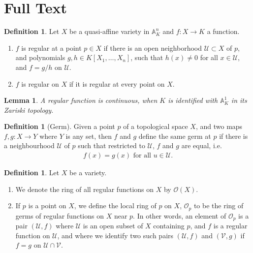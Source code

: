 \documentclass[11pt]{book}
\newtheorem{lemma}[theorem]{Lemma}
\theoremstyle{definition}
\newtheorem{definition}[theorem]{Definition}
\numberwithin{equation}{section}
\begin{document}
\section{Full Text}
\begin{defbox}
    \begin{definition}
        Let \(X\) be a quasi-affine variety in \(\mathbb{A}^n_K\) and \(f: X \rightarrow K\) a function.
        \begin{enumerate}
            \item \(f\) is regular at a point \(p \in X\) if there is an open neighborhood \(\mathcal{U} \subset X\) of \(p\), and polynomials \(g, h \in K[X_1, \ldots, X_n]\), such that \(h(x) \neq 0\) for all \(x \in \mathcal{U}\), and \(f = g/h\) on \(\mathcal{U}\).
            \item \(f\) is regular on \(X\) if it is regular at every point on \(X\).
        \end{enumerate}
    \end{definition}
\end{defbox}
\begin{thmbox}
    \begin{lemma}
        A regular function is continuous, when \(K\) is identified with \(\mathbb{A}^1_K\) in its Zariski topology.
    \end{lemma}
\end{thmbox}
\begin{defbox}
    \begin{definition}[Germ]
        Given a point \(p\) of a topological space \(X\), and two maps \(f, g: X \rightarrow Y\) where \(Y\) is any set, then \(f\) and \(g\) define the same germ at \(p\) if there is a neighbourhood \(\mathcal{U}\) of \(p\) such that restricted to \(\mathcal{U}\), \(f\) and \(g\) are equal, i.e.
        \begin{align*}
            f(x) = g(x) \text{ for all } u \in \mathcal{U} \text{.}
        \end{align*}
    \end{definition}
\end{defbox}
\begin{defbox}
    \begin{definition}
        Let \(X\) be a variety.
        \begin{enumerate}
            \item We denote the ring of all regular functions on \(X\) by \(\mathcal{O}(X)\).
            \item If \(p\) is a point on \(X\), we define the local ring of \(p\) on \(X\), \(\mathcal{O}_p\) to be the ring of germs of regular functions on \(X\) near \(p\). In other words, an element of \(\mathcal{O}_p\) is a pair \((\mathcal{U}, f)\) where \(\mathcal{U}\) is an open subset of \(X\) containing \(p\), and \(f\) is a regular function on \(\mathcal{U}\), and where we identify two such pairs \((\mathcal{U}, f)\) and \((\mathcal{V}, g)\) if \(f = g\) on \(\mathcal{U} \cap \mathcal{V}\).
        \end{enumerate}
    \end{definition}
\end{defbox}
\end{document}

